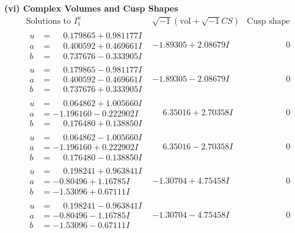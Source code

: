 \documentclass[1p]{elsarticle_modified}
\theoremstyle{definition}
\newcommand{\I}{\sqrt{-1}}
\begin{document}
\newpage\flushleft \textbf{(vi) Complex Volumes and Cusp Shapes}
$$\begin{array}{c|c|c}  
\text{Solutions to }I^u_{1}& \I (\text{vol} + \sqrt{-1}CS) & \text{Cusp shape}\\
 \hline 
\begin{aligned}
u &= \phantom{-}0.179865 + 0.981177 I \\
a &= \phantom{-}0.400592 + 0.469661 I \\
b &= \phantom{-}0.737676 - 0.333905 I\end{aligned}
 & -1.89305 + 2.08679 I & \phantom{-0.000000 } 0 \\ \hline\begin{aligned}
u &= \phantom{-}0.179865 - 0.981177 I \\
a &= \phantom{-}0.400592 - 0.469661 I \\
b &= \phantom{-}0.737676 + 0.333905 I\end{aligned}
 & -1.89305 - 2.08679 I & \phantom{-0.000000 } 0 \\ \hline\begin{aligned}
u &= \phantom{-}0.064862 + 1.005660 I \\
a &= -1.196160 - 0.222902 I \\
b &= \phantom{-}0.176480 + 0.138850 I\end{aligned}
 & \phantom{-}6.35016 + 2.70358 I & \phantom{-0.000000 } 0 \\ \hline\begin{aligned}
u &= \phantom{-}0.064862 - 1.005660 I \\
a &= -1.196160 + 0.222902 I \\
b &= \phantom{-}0.176480 - 0.138850 I\end{aligned}
 & \phantom{-}6.35016 - 2.70358 I & \phantom{-0.000000 } 0 \\ \hline\begin{aligned}
u &= \phantom{-}0.198241 + 0.963841 I \\
a &= -0.80496 + 1.16785 I \\
b &= -1.53096 + 0.67111 I\end{aligned}
 & -1.30704 + 4.75458 I & \phantom{-0.000000 } 0 \\ \hline\begin{aligned}
u &= \phantom{-}0.198241 - 0.963841 I \\
a &= -0.80496 - 1.16785 I \\
b &= -1.53096 - 0.67111 I\end{aligned}
 & -1.30704 - 4.75458 I & \phantom{-0.000000 } 0 \\ \hline\begin{aligned}

\end{aligned}
\end{array}$$
\end{document}
